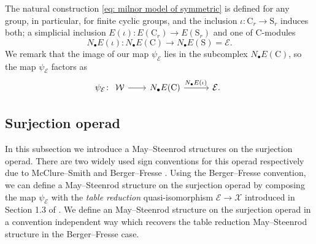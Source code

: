 \begin{remark}
	The natural construction \eqref{eq: milnor model of symmetric} is defined for any group, in particular, for finite cyclic groups, and the inclusion $\iota \colon \mathrm C_r \to \mathrm S_r$ induces both; a simplicial inclusion $E(\iota) \colon E(\mathrm C_r) \to E(\mathrm S_r)$ and one of $\mathrm C$-modules
	\begin{equation*}
	N_\bullet E(\iota) \colon N_\bullet E(\mathrm C) \to N_\bullet E(\mathrm S) = \mathcal E.
	\end{equation*}
	We remark that the image of our map $\psi_{\mathcal E}$ lies in the subcomplex $N_\bullet E(\mathrm C)$, so the map $\psi_{\mathcal E}$ factors as
	\begin{equation*}
	\psi_{\mathcal E} \colon
	\begin{tikzcd}
	\mathcal W \arrow[r] &[-3pt] N_\bullet E(\mathrm C) \arrow[r, "N_\bullet E(\iota)\,"] &[5pt] \mathcal E.
	\end{tikzcd}
	\end{equation*}
\end{remark}

\subsection{Surjection operad}

In this subsection we introduce a May--Steenrod structures on the surjection operad.
There are two widely used sign conventions for this operad respectively due to McClure--Smith \cite{mcclure03cochain} and Berger--Fresse \cite{berger04combinatorial}.
Using the Berger--Fresse convention, we can define a May--Steenrod structure on the surjection operad by composing the map $\psi_{\mathcal E}$ with the \textit{table reduction} quasi-isomorphism $\mathcal E \to \mathcal X$ introduced in Section 1.3 of \cite{berger04combinatorial}.
We define an May--Steenrod structure on the surjection operad in a convention independent way which recovers the table reduction May--Steenrod structure in the Berger--Fresse case.

